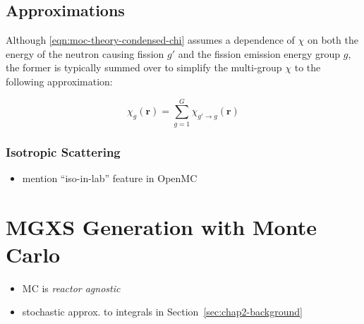 


\subsection{Approximations}
\label{subsec:chap2-approx}

Although \autoref{eqn:moc-theory-condensed-chi} assumes a dependence of $\chi$ on both the energy of the neutron causing fission $g'$ and the fission emission energy group $g$, the former is typically summed over to simplify the multi-group $\chi$ to the following approximation:

\begin{equation}
\label{eqn:moc-theory-condensed-chi-group}
\chi_{g}(\mathbf{r}) = \displaystyle\sum\limits_{g=1}^{G}\chi_{g'\rightarrow g}(\mathbf{r})
\end{equation}


\subsubsection{Isotropic Scattering}
\label{subsubsec:chap2-iso-scatter}

\begin{itemize}
  \item mention ``iso-in-lab'' feature in OpenMC
\end{itemize}


\section{MGXS Generation with Monte Carlo}
\label{sec:chap2-mgxs-mc}

\begin{itemize}[noitemsep]
  \item \ac{MC} is \emph{reactor agnostic}
  \item stochastic approx. to integrals in Section~\ref{sec:chap2-background}
\end{itemize}

